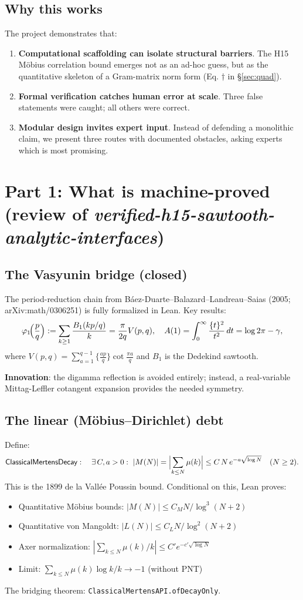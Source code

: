 \documentclass[11pt,a4paper]{article}
\newcommand{\fract}[1]{\{#1\}}
\begin{document}
\subsection{Why this works}

The project demonstrates that:
\begin{enumerate}
\item \textbf{Computational scaffolding can isolate structural barriers}. The H15 Möbius correlation bound emerges not as an ad-hoc guess, but as the quantitative skeleton of a Gram-matrix norm form (Eq. $\dagger$ in \S\ref{sec:quad}).
\item \textbf{Formal verification catches human error at scale}. Three false statements were caught; all others were correct.
\item \textbf{Modular design invites expert input}. Instead of defending a monolithic claim, we present three routes with documented obstacles, asking experts which is most promising.
\end{enumerate}

\section{Part 1: What is machine-proved (review of \textit{verified-h15-sawtooth-analytic-interfaces})}

\subsection{The Vasyunin bridge (closed)}

The period-reduction chain from Báez-Duarte--Balazard--Landreau--Saias (2005; arXiv:math/0306251) is fully formalized in Lean. Key results:
\[
\varphi_1\!\Bigl(\frac pq\Bigr):=\sum_{k\ge1}\frac{B_1(kp/q)}{k}
=\frac{\pi}{2q}V(p,q),
\quad
A(1)=\int_0^\infty\frac{\fract t^2}{t^2}\,dt=\log 2\pi-\gamma,
\]
where $V(p,q)=\sum_{a=1}^{q-1}\fract{\tfrac{ap}{q}}\cot\frac{\pi a}{q}$ and $B_1$ is the Dedekind sawtooth.

\textbf{Innovation}: the digamma reflection is avoided entirely; instead, a real-variable Mittag-Leffler cotangent expansion provides the needed symmetry.

\subsection{The linear (Möbius--Dirichlet) debt}

Define:
\[
\textsf{ClassicalMertensDecay}:\quad
\exists\,C,a>0:\ |M(N)|=\Bigl|\sum_{k\le N}\mu(k)\Bigr|\le C\,N\,e^{-a\sqrt{\log N}}\quad(N\ge2).
\]
This is the 1899 de la Vallée Poussin bound. Conditional on this, Lean proves:
\begin{itemize}
\item Quantitative Möbius bounds: $|M(N)|\le C_M N/\log^3(N+2)$
\item Quantitative von Mangoldt: $|L(N)|\le C_L N/\log^2(N+2)$
\item Axer normalization: $|\sum_{k\le N}\mu(k)/k|\le C' e^{-c'\sqrt{\log N}}$
\item Limit: $\sum_{k\le N}\mu(k)\log k/k\to-1$ (without PNT)
\end{itemize}
The bridging theorem: \texttt{ClassicalMertensAPI.ofDecayOnly}.
\end{document}
